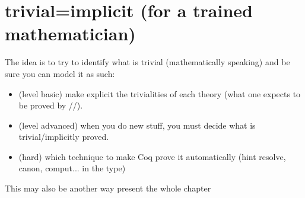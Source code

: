 \section{trivial=implicit (for a trained mathematician)}
The idea is to try to identify what is trivial (mathematically speaking)
and be sure you can model it as such:
\begin{itemize}
\item (level basic) make explicit the trivialities of each theory (what one
	expects to be proved by //). 
\item (level advanced) when you do new stuff, you must decide what is
	trivial/implicitly proved.
\item (hard) which technique to make Coq prove it automatically (hint resolve,
	canon, comput... in the type)
\end{itemize}

This may also be another way present the whole chapter

